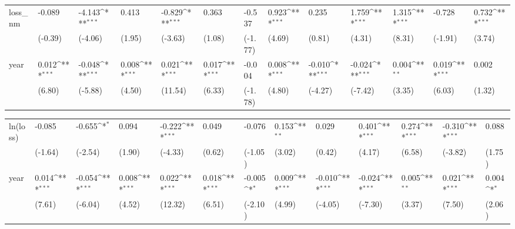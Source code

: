 \def\sym#1{\ifmmode^{#1}\else\(^{#1}\)\fi}
\begin{tabular}{p{1.5cm} p{1.7cm} p{1.7cm} p{1.7cm}  p{1.7cm} p{1.7cm} p{1.7cm} p{1.7cm} p{1.7cm}  p{1.7cm} p{1.7cm} p{1.7cm} p{1.7cm} }
\hline
loss\_nm         &   -0.089         &   -4.143\sym{***}&    0.413         &   -0.829\sym{***}&    0.363         &   -0.537         &    0.923\sym{***}&    0.235         &    1.759\sym{***}&    1.315\sym{***}&   -0.728         &    0.732\sym{***}\\
                &  (-0.39)         &  (-4.06)         &   (1.95)         &  (-3.63)         &   (1.08)         &  (-1.77)         &   (4.69)         &   (0.81)         &   (4.31)         &   (8.31)         &  (-1.91)         &   (3.74)         \\
year            &    0.012\sym{***}&   -0.048\sym{***}&    0.008\sym{***}&    0.021\sym{***}&    0.017\sym{***}&   -0.004         &    0.008\sym{***}&   -0.010\sym{***}&   -0.024\sym{***}&    0.004\sym{**} &    0.019\sym{***}&    0.002         \\
                &   (6.80)         &  (-5.88)         &   (4.50)         &  (11.54)         &   (6.33)         &  (-1.78)         &   (4.80)         &  (-4.27)         &  (-7.42)         &   (3.35)         &   (6.03)         &   (1.32)         \\
\end{tabular}
\def\sym#1{\ifmmode^{#1}\else\(^{#1}\)\fi}
\begin{tabular}{p{1.5cm} p{1.7cm} p{1.7cm} p{1.7cm}  p{1.7cm} p{1.7cm} p{1.7cm} p{1.7cm} p{1.7cm}  p{1.7cm} p{1.7cm} p{1.7cm} p{1.7cm} }
\hline
ln(loss)        &   -0.085         &   -0.655\sym{*}  &    0.094         &   -0.222\sym{***}&    0.049         &   -0.076         &    0.153\sym{**} &    0.029         &    0.401\sym{***}&    0.274\sym{***}&   -0.310\sym{***}&    0.088         \\
                &  (-1.64)         &  (-2.54)         &   (1.90)         &  (-4.33)         &   (0.62)         &  (-1.05)         &   (3.02)         &   (0.42)         &   (4.17)         &   (6.58)         &  (-3.82)         &   (1.75)         \\
year            &    0.014\sym{***}&   -0.054\sym{***}&    0.008\sym{***}&    0.022\sym{***}&    0.018\sym{***}&   -0.005\sym{*}  &    0.009\sym{***}&   -0.010\sym{***}&   -0.024\sym{***}&    0.005\sym{**} &    0.021\sym{***}&    0.004\sym{*}  \\
                &   (7.61)         &  (-6.04)         &   (4.52)         &  (12.32)         &   (6.51)         &  (-2.10)         &   (4.99)         &  (-4.05)         &  (-7.30)         &   (3.37)         &   (7.50)         &   (2.06)         \\
\end{tabular}
